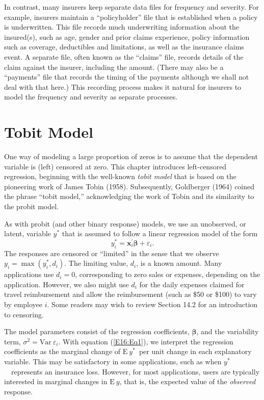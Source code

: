 In contrast, many insurers keep separate data files for frequency
and severity. For example, insurers maintain a ``policyholder'' file
that is established when a policy is underwritten. This file records
much underwriting information about the insured(s), such as age,
gender and prior claims experience, policy information such as
coverage, deductibles and limitations, as well as the insurance
claims event. A separate file, often known as the ``claims'' file,
records details of the claim against the insurer, including the
amount. (There may also be a ``payments'' file that records the
timing of the payments although we shall not deal with that here.)
This recording process makes it natural for insurers to model the
frequency and severity as separate processes.

\section{Tobit Model}

One way of modeling a large proportion of zeros is to assume that
the dependent variable is (left) censored at zero. This chapter
introduces left-censored regression, beginning with the well-known
\emph{tobit model} that is based on the pioneering work of James
Tobin (1958). Subsequently, Goldberger (1964) coined the phrase
``tobit model,'' acknowledging the work of Tobin and its similarity
to the probit model.


As with probit (and other binary response) models, we use an
unobserved, or latent, variable $y^{\ast}$ that is assumed to follow
a linear regression
model of the form%
\begin{equation}\label{E16:Eq1}
y_i^{\ast} = \mathbf{x}_i^{\prime} \boldsymbol \beta +
\varepsilon_i.
\end{equation}
The responses are censored or ``limited'' in the sense that we
observe $y_i = \max \left( y_i^{\ast},d_i\right)$. The limiting
value, $d_i$, is a known amount. Many applications use $d_i=0$,
corresponding to zero sales or expenses, depending on the
application. However, we also might use $d_i$ for the daily expenses
claimed for travel reimbursement and allow the reimbursement (such
as \$50 or \$100) to vary by employee $i$. Some readers may wish to
review Section 14.2 for an introduction to censoring.

The model parameters consist of the regression coefficients,
$\boldsymbol \beta $, and the variability term, $\sigma
^{2}=\mathrm{Var}~\varepsilon _i$. With equation (\ref{E16:Eq1}), we
interpret the regression coefficients as the marginal change of
$\mathrm{E~}y^{\ast}$\ per unit change in each explanatory variable.
This may be satisfactory in some applications, such as when
$y^{\ast}$\ \ represents an insurance loss. However, for most
applications, users are typically interested in marginal changes in
$\mathrm{E~}y$, that is, the expected value of the \emph{observed}
response.

